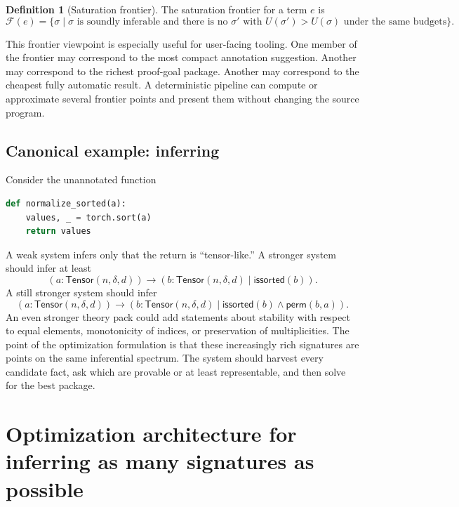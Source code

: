 \documentclass[11pt]{article}
\newcommand{\py}[1]{\texttt{\detokenize{#1}}}
\theoremstyle{definition}
\newtheorem{definition}{Definition}[section]
\theoremstyle{plain}
\begin{document}
\begin{definition}[Saturation frontier]
The saturation frontier for a term $e$ is
\[
\mathcal{F}(e) = \{\sigma \mid \sigma \text{ is soundly inferable and there is no }
\sigma' \text{ with } U(\sigma') > U(\sigma) \text{ under the same budgets}\}.
\]
\end{definition}

This frontier viewpoint is especially useful for user-facing tooling. One member
of the frontier may correspond to the most compact annotation suggestion. Another
may correspond to the richest proof-goal package. Another may correspond to the
cheapest fully automatic result. A deterministic pipeline can compute or
approximate several frontier points and present them without changing the source
program.

\subsection{Canonical example: inferring \py{a : Tensor | issorted(a)}}
Consider the unannotated function
\begin{lstlisting}[style=deppy,language=Python]
def normalize_sorted(a):
    values, _ = torch.sort(a)
    return values
\end{lstlisting}
A weak system infers only that the return is ``tensor-like.'' A stronger system
should infer at least
\[
(a : \mathsf{Tensor}(n,\delta,d)) \to
(b : \mathsf{Tensor}(n,\delta,d) \mid \mathsf{issorted}(b)).
\]
A still stronger system should infer
\[
(a : \mathsf{Tensor}(n,\delta,d)) \to
(b : \mathsf{Tensor}(n,\delta,d) \mid
\mathsf{issorted}(b) \wedge \mathsf{perm}(b,a)).
\]
An even stronger theory pack could add statements about stability with respect to
equal elements, monotonicity of indices, or preservation of multiplicities. The
point of the optimization formulation is that these increasingly rich signatures
are points on the same inferential spectrum. The system should harvest every
candidate fact, ask which are provable or at least representable, and then solve
for the best package.

\section{Optimization architecture for inferring as many signatures as possible}
\end{document}
